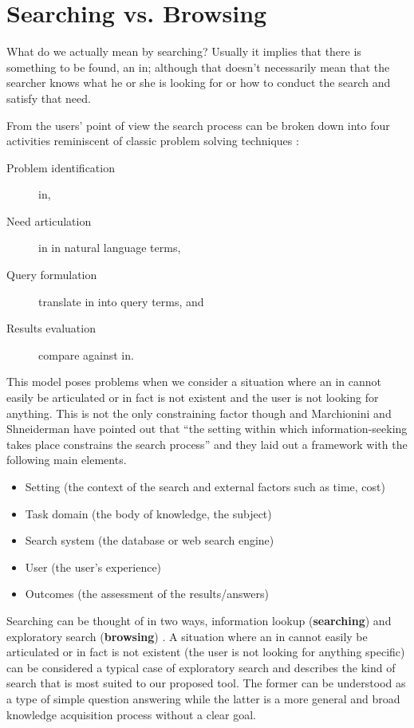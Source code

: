 \section{Searching vs. Browsing}

What do we actually mean by searching? Usually it implies that there is something to be found, an \gls{in}; although that doesn’t necessarily mean that the searcher knows what he or she is looking for or how to conduct the search and satisfy that need.

From the users' point of view the search process can be broken down into four activities \autocite{Sutcliffe1998} reminiscent of classic problem solving techniques \autocite{Polya1957}:

\begin{description}
  \item [Problem identification] \gls{in},
  \item [Need articulation] \gls{in} in natural language terms,
  \item [Query formulation] translate \gls{in} into query terms, and
  \item [Results evaluation] compare against \gls{in}.
\end{description}

This model poses problems when we consider a situation where an \gls{in} cannot easily be articulated or in fact is not existent and the user is not looking for anything. This is not the only constraining factor though and Marchionini and Shneiderman have pointed out that ``the setting within which information-seeking takes place constrains the search process'' \autocite{Marchionini1988} and they laid out a framework with the following main elements.

\begin{itemize}
  \item Setting (the context of the search and external factors such as time, cost)
  \item Task domain (the body of knowledge, the subject)
  \item Search system (the database or web search engine)
  \item User (the user’s experience)
  \item Outcomes (the assessment of the results/answers)
\end{itemize}

Searching can be thought of in two ways, information lookup (\textbf{searching}) and exploratory search (\textbf{browsing}) \autocite{DeVries1993, Marchionini2006}. A situation where an \gls{in} cannot easily be articulated or in fact is not existent (the user is not looking for anything specific) can be considered a typical case of exploratory search and describes the kind of search that is most suited to our proposed tool. The former can be understood as a type of simple question answering while the latter is a more general and broad knowledge acquisition process without a clear goal.

